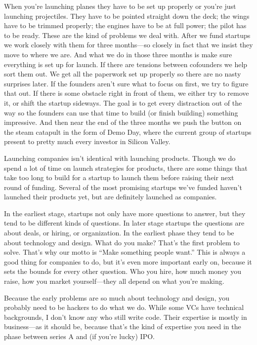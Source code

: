 When you're launching planes they have to be set up properly or you're
just launching projectiles. They have to be pointed straight down the
deck; the wings have to be trimmed properly; the engines have to be at
full power; the pilot has to be ready. These are the kind of problems we
deal with. After we fund startups we work closely with them for three
months---so closely in fact that we insist they move to where we are.
And what we do in those three months is make sure everything is set up
for launch. If there are tensions between cofounders we help sort them
out. We get all the paperwork set up properly so there are no nasty
surprises later. If the founders aren't sure what to focus on first, we
try to figure that out. If there is some obstacle right in front of
them, we either try to remove it, or shift the startup sideways. The
goal is to get every distraction out of the way so the founders can use
that time to build (or finish building) something impressive. And then
near the end of the three months we push the button on the steam
catapult in the form of Demo Day, where the current group of startups
present to pretty much every investor in Silicon Valley.

Launching companies isn't identical with launching products. Though we
do spend a lot of time on launch strategies for products, there are some
things that take too long to build for a startup to launch them before
raising their next round of funding. Several of the most promising
startups we've funded haven't launched their products yet, but are
definitely launched as companies.

In the earliest stage, startups not only have more questions to answer,
but they tend to be different kinds of questions. In later stage
startups the questions are about deals, or hiring, or organization. In
the earliest phase they tend to be about technology and design. What do
you make? That's the first problem to solve. That's why our motto is
``Make something people want.'' This is always a good thing for
companies to do, but it's even more important early on, because it sets
the bounds for every other question. Who you hire, how much money you
raise, how you market yourself---they all depend on what you're making.

Because the early problems are so much about technology and design, you
probably need to be hackers to do what we do. While some VCs have
technical backgrounds, I don't know any who still write code. Their
expertise is mostly in business---as it should be, because that's the
kind of expertise you need in the phase between series A and (if you're
lucky) IPO.

